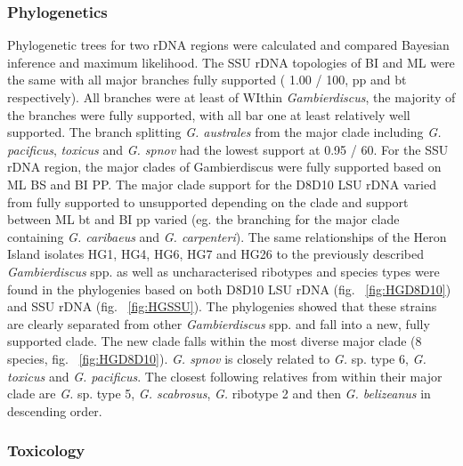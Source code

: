 \documentclass[12pt]{article}
\begin{document}

\subsubsection{Phylogenetics}

Phylogenetic trees for two rDNA regions were calculated and compared Bayesian inference and maximum likelihood. The SSU rDNA  topologies of BI and ML were the same with all major branches fully supported ( 1.00 / 100, pp and bt respectively). All branches were at least of  WIthin \emph{Gambierdiscus}, the majority of the branches were fully supported, with all bar one at least relatively well supported. The branch splitting \emph{G. australes} from the major clade including \emph{G. pacificus}, \emph{toxicus} and \emph{G. spnov} had the lowest support at 0.95 / 60.
For the SSU rDNA region, the major clades of Gambierdiscus were fully supported based on ML BS and BI PP. The major clade support for the D8D10 LSU rDNA varied from fully supported to unsupported depending on the clade and support between ML bt and BI pp varied (eg. the branching for the major clade containing \emph{G. caribaeus} and \emph{G. carpenteri}). The same relationships of the Heron Island isolates HG1, HG4, HG6, HG7 and HG26 to the previously described \emph{Gambierdiscus} spp. as well as uncharacterised ribotypes and species types were found in the phylogenies based on both D8D10 LSU rDNA (fig. ~\ref{fig:HGD8D10}) and SSU rDNA (fig. ~\ref{fig:HGSSU}). The phylogenies showed that these strains are clearly separated from other \emph{Gambierdiscus} spp. and fall into a new, fully supported clade. The new clade falls within the most diverse major clade (8 species, fig. ~\ref{fig:HGD8D10}). \emph{G. spnov} is closely related to \emph{G.} sp. type 6, \emph{G. toxicus} and \emph{G. pacificus}. The closest following relatives from within their major clade are \emph{G.} sp. type 5, \emph{G. scabrosus}, \emph{G.} ribotype 2 and then \emph{G. belizeanus} in descending order. \\


\subsubsection{Toxicology}
\end{document}

